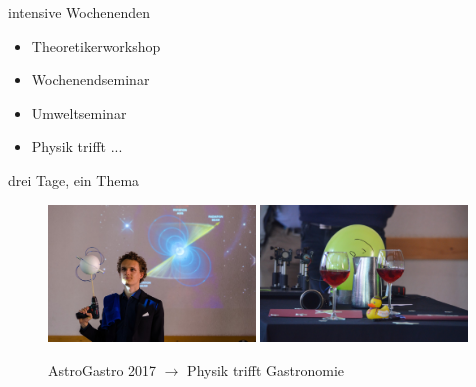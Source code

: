 \documentclass[
]{beamer}
\begin{document}
\begin{frame}{intensive Wochenenden}
  \begin{minipage}[0.4\textwidth]
    \begin{itemize}
      \item Theoretikerworkshop
      \item Wochenendseminar
      \item Umweltseminar
      \item Physik trifft ...
    \end{itemize}
    drei Tage, ein Thema
  \end{minipage}
  \begin{minipage}[0.6\textwidth]
    \begin{figure}
      \centering
      \includegraphics[width=0.49\textwidth]{figure/astrogastro_2017_david}\hfill
      \includegraphics[width=0.49\textwidth]{figure/astrogastro_2017_wein}\\
      \begin{center}
        AstroGastro 2017 $\rightarrow$ Physik trifft Gastronomie
      \end{center}
     \end{figure}
  \end{minipage}
  

\end{frame}
\end{document}
